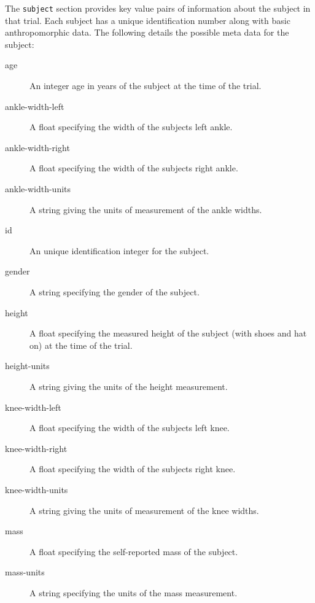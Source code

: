 \documentclass[fleqn,10pt]{wlpeerj}
\begin{document}
The \verb+subject+ section provides key value pairs of information about the
subject in that trial. Each subject has a unique identification number along
with basic anthropomorphic data. The following details the possible meta data
for the subject:
%
\begin{description}
  \item[age] An integer age in years of the subject at the time of the trial.
  \item[ankle-width-left] A float specifying the width of the subjects left
    ankle.
  \item[ankle-width-right] A float specifying the width of the subjects right
    ankle.
  \item[ankle-width-units] A string giving the units of measurement of the
    ankle widths.
  \item[id] An unique identification integer for the subject.
  \item[gender] A string specifying the gender of the subject.
  \item[height] A float specifying the measured height of the subject (with
    shoes and hat on) at the time of the trial.
  \item[height-units] A string giving the units of the height measurement.
  \item[knee-width-left] A float specifying the width of the subjects left
    knee.
  \item[knee-width-right] A float specifying the width of the subjects right
    knee.
  \item[knee-width-units] A string giving the units of measurement of the
    knee widths.
  \item[mass] A float specifying the self-reported mass of the subject.
  \item[mass-units] A string specifying the units of the mass measurement.
\end{description}
\end{document}
